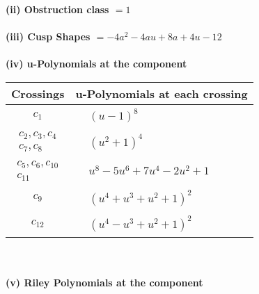 \documentclass[1p]{elsarticle_modified}
\theoremstyle{definition}
\begin{document}
\flushleft \textbf{(ii) Obstruction class $= 1$}\\~\\
\flushleft \textbf{(iii) Cusp Shapes $= -4 a^2-4 a u+8 a+4 u-12$}\\~\\
\newpage\renewcommand{\arraystretch}{1}
\flushleft \textbf{(iv) u-Polynomials at the component}\newline \\
\begin{tabular}{m{50pt}|m{274pt}}
Crossings & \hspace{64pt}u-Polynomials at each crossing \\
\hline $$\begin{aligned}c_{1}\end{aligned}$$&$\begin{aligned}
&(u-1)^8
\end{aligned}$\\
\hline $$\begin{aligned}c_{2},c_{3},c_{4}\\c_{7},c_{8}\end{aligned}$$&$\begin{aligned}
&(u^2+1)^4
\end{aligned}$\\
\hline $$\begin{aligned}c_{5},c_{6},c_{10}\\c_{11}\end{aligned}$$&$\begin{aligned}
&u^8-5 u^6+7 u^4-2 u^2+1
\end{aligned}$\\
\hline $$\begin{aligned}c_{9}\end{aligned}$$&$\begin{aligned}
&(u^4+u^3+u^2+1)^2
\end{aligned}$\\
\hline $$\begin{aligned}c_{12}\end{aligned}$$&$\begin{aligned}
&(u^4- u^3+u^2+1)^2
\end{aligned}$\\
\hline
\end{tabular}\\~\\
\newpage\renewcommand{\arraystretch}{1}
\flushleft \textbf{(v) Riley Polynomials at the component}\newline \\
\end{document}
